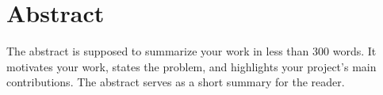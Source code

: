 \section*{Abstract}\label{sec:abstract}
The abstract is supposed to summarize your work in less than 300 words. It motivates your work, states the
problem, and highlights your project's main contributions. The abstract serves as a short summary for the
reader.